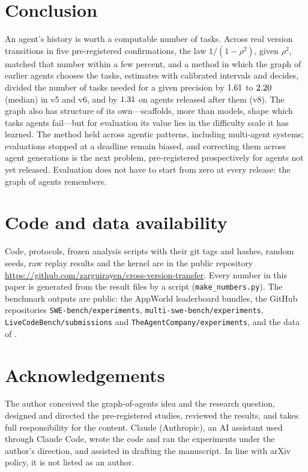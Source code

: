 \documentclass[11pt]{article}
\begin{document}
\section{Conclusion}
An agent's history is worth a computable number of tasks. Across \NConf{} real version transitions in five
pre-registered confirmations, the law $1/(1-\rho^2)$, given $\rho^2$, matched that number within a few percent, and a method in which
the graph of earlier agents chooses the tasks, estimates with calibrated intervals and decides, divided the number of
tasks needed for a given precision by $1.61$ to $2.20$ (median) in v5 and v6, and by $1.31$ on agents released after them (v8). The graph also has structure of its own---scaffolds, more than models, shape which tasks
agents fail---but for evaluation its value lies in the difficulty scale it has learned. The method held across
agentic patterns, including multi-agent systems; evaluations stopped at a deadline remain biased, and correcting
them across agent generations is the next problem, pre-registered prospectively for agents not yet released. Evaluation does not have to start
from zero at every release: the graph of agents remembers.

\section*{Code and data availability}
Code, protocols, frozen analysis scripts with their git tags and hashes, random seeds, raw replay results and the
kernel are in the public repository \url{https://github.com/zarguirayen/cross-version-transfer}. Every number in this paper is
generated from the result files by a script (\texttt{make\_numbers.py}). The
benchmark outputs are public: the AppWorld leaderboard bundles, the GitHub repositories
\texttt{SWE-bench/\allowbreak experiments}, \texttt{multi-swe-bench/\allowbreak experiments},
\texttt{LiveCodeBench/\allowbreak submissions} and \texttt{TheAgentCompany/\allowbreak experiments}, and the data of
\citet{sheng2026regression}.

\section*{Acknowledgements}
The author conceived the graph-of-agents idea and the research question, designed and directed the pre-registered
studies, reviewed the results, and takes full responsibility for the content. Claude (Anthropic), an AI assistant used
through Claude Code, wrote the code and ran the experiments under the author's direction, and assisted in drafting the
manuscript. In line with arXiv policy, it is not listed as an author.
\end{document}
